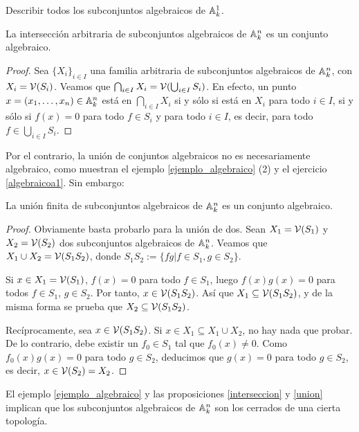 \documentclass[ACGA.tex]{subfiles}
\begin{document}
\begin{ejer}\label{algebraicoa1} Describir todos los subconjuntos algebraicos de $\mathbb{A}^1_k$.
 
\end{ejer}

\begin{prop}\label{interseccion} La intersección arbitraria de subconjuntos algebraicos de $\mathbb{A}^n_k$ es un conjunto algebraico.
 
\end{prop}

\begin{proof}
 Sea $\{X_i\}_{i\in I}$ una familia arbitraria de subconjuntos algebraicos de $\mathbb{A}^n_k$, con $X_i=\mathcal{V}(S_i)$. Veamos que $\bigcap_{i\in I}X_i=\mathcal{V}(\bigcup_{i\in I} S_i)$. En efecto, un punto $x=(x_1,\ldots,x_n)\in\mathbb{A}^n_k$ está en $\bigcap_{i\in I}X_i$ si y sólo si está en $X_i$ para todo $i\in I$, si y sólo si $f(x)=0$ para todo $f\in S_i$ y para todo $i\in I$, es decir, para todo $f\in \bigcup_{i\in I} S_i$.
\end{proof}

Por el contrario, la unión de conjuntos algebraicos no es necesariamente algebraico, como muestran el ejemplo \ref{ejemplo_algebraico} (2) y el ejercicio \ref{algebraicoa1}. Sin embargo:

\begin{prop}\label{union} La unión finita de subconjuntos algebraicos de $\mathbb{A}^n_k$ es un conjunto algebraico.
 
\end{prop}

\begin{proof}
 Obviamente basta probarlo para la unión de dos. Sean $X_1=\mathcal{V}(S_1)$ y $X_2=\mathcal{V}(S_2)$ dos subconjuntos algebraicos de $\mathbb{A}^n_k$. Veamos que $X_1\cup X_2=\mathcal{V}(S_1S_2)$, donde $S_1S_2:=\{fg| f\in S_1,g\in S_2\}$.

Si $x\in X_1=\mathcal{V}(S_1)$, $f(x)=0$ para todo $f\in S_1$, luego $f(x)g(x)=0$ para todos $f\in S_1$, $g\in S_2$. Por tanto, $x\in \mathcal{V}(S_1S_2)$. Así que $X_1\subseteq \mathcal{V}(S_1S_2)$, y de la misma forma se prueba que $X_2\subseteq \mathcal{V}(S_1S_2)$. 

Recíprocamente, sea $x\in \mathcal{V}(S_1S_2)$. Si $x\in X_1\subseteq X_1\cup X_2$, no hay nada que probar. De lo contrario, debe existir un $f_0\in S_1$ tal que $f_0(x)\neq 0$. Como $f_0(x)g(x)=0$ para todo $g\in S_2$, deducimos que $g(x)=0$ para todo $g\in S_2$, es decir, $x\in \mathcal{V}(S_2)=X_2$.
\end{proof}

El ejemplo \ref{ejemplo_algebraico} y las proposiciones \ref{interseccion} y \ref{union} implican que los subconjuntos algebraicos de $\mathbb{A}^n_k$ son los cerrados de una cierta topología.
\end{document}
